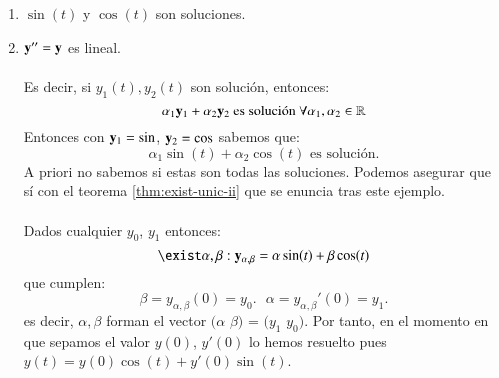 \begin{eg}[Muelles]
    \begin{enumerate}
        \item $\sin (t)$ y $\cos(t)$ son soluciones.
        \item $\mathbf{y}'' = \mathbf{y}$ es lineal.\\\\
        Es decir, si $y_1(t), y_2(t)$ son solución, entonces:
        $$
            \alpha_1 \mathbf{y}_1 + \alpha_2 \mathbf{y}_2 \text{ es solución } \forall \alpha_1, \alpha_2 \in \mathbb{R}
        $$
        Entonces con $\mathbf{y}_1 = \sin$, $\mathbf{y}_2 = \cos$ sabemos que:
        $$
            \alpha_1\sin(t) + \alpha_2\cos(t) \text{ es solución.}
        $$
        A priori no sabemos si estas son todas las soluciones. Podemos asegurar que sí con el teorema \ref{thm:exist-unic-ii} que se enuncia tras este ejemplo.\\\\
        Dados cualquier $y_0$, $y_1$ entonces:
        $$
            \exist \alpha, \beta : \mbf{y}_{\alpha, \beta} = \alpha \sin (t) + \beta \cos (t)
        $$
        que cumplen:
        $$
            \beta = y_{\alpha, \beta} (0) = y_0.\text{         } \alpha = y_{\alpha, \beta}'(0) = y_1.
        $$
        es decir, $\alpha, \beta$ forman el vector $(\alpha$ $\beta)$ = $(y_1$ $y_0)$. Por tanto, en el momento en que sepamos el valor $y(0)$, $y'(0)$ lo hemos resuelto pues $y(t) = y(0) \cos (t) + y'(0) \sin (t)$.
    \end{enumerate}
\end{eg}

